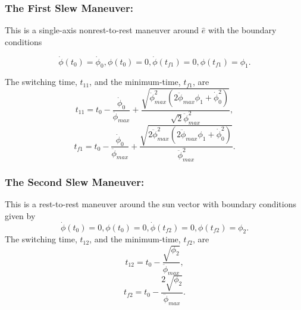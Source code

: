 \documentclass[journal ]{new-aiaa}
\begin{document}
	
	\subsubsection{The First Slew Maneuver:} 
	This is a single-axis nonrest-to-rest maneuver around $\hat{e}$ with the boundary conditions

	\begin{equation}\label{Bc1}
	\dot{\phi}(t_0)=\dot{\phi}_{0},\phi(t_0)=0, \dot{\phi}(t_{f1})=0,\phi(t_{f1})=\phi_1.
	\end{equation}
	
	The switching time, $t_{11}$, and the minimum-time, $t_{f1}$, are 
	\begin{equation}\label{t11}
	t_{11}=t_0-\frac{\dot{\phi}_0}{\ddot{\phi}_{max}}+\frac{\sqrt{\ddot{\phi}_{max}^2(2\ddot{\phi}_{max}\phi_1+\dot{\phi}_{0}^2)}}{\sqrt{2}\ddot{\phi}_{max}^2},
	\end{equation}
	\begin{equation}\label{tf1}
	t_{f1}=t_0-\frac{\dot{\phi}_0}{\ddot{\phi}_{max}}+\frac{\sqrt{2\ddot{\phi}_{max}^2(2\ddot{\phi}_{max}\phi_1+\dot{\phi}_{0}^2)}}{\ddot{\phi}_{max}^2}.
	\end{equation}

	
	
	\subsubsection{The Second Slew Maneuver:}
	This is a rest-to-rest maneuver around the sun vector with boundary conditions given by	
	\begin{equation}\label{Bc2}
	\dot{\phi}(t_0)=0, \phi(t_0)=0, \dot{\phi}(t_{f2})=0, \phi(t_{f2})=\phi_2.
	\end{equation}
	The switching time, $t_{12}$, and the minimum-time, $t_{f2}$, are
	\begin{equation}\label{t21}
	t_{12}=t_0-\frac{\sqrt{\phi_2}}{\ddot{\phi}_{max}},
	\end{equation}
	\begin{equation}\label{tf2}
	t_{f2}=t_0-\frac{2\sqrt{\phi_2}}{\ddot{\phi}_{max}}.
	\end{equation}
\end{document}
